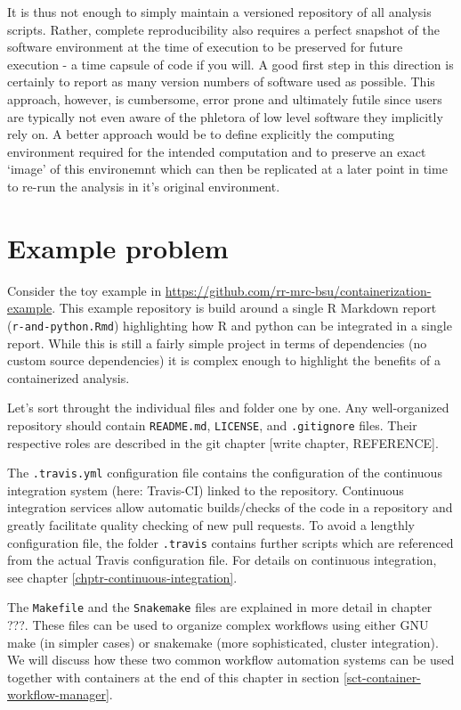 \documentclass[]{book}
\begin{document}
It is thus not enough to simply maintain a versioned repository of all
analysis scripts. Rather, complete reproducibility also requires a
perfect snapshot of the software environment at the time of execution to
be preserved for future execution - a time capsule of code if you will.
A good first step in this direction is certainly to report as many
version numbers of software used as possible. This approach, however, is
cumbersome, error prone and ultimately futile since users are typically
not even aware of the phletora of low level software they implicitly
rely on. A better approach would be to define explicitly the computing
environment required for the intended computation and to preserve an
exact `image' of this environemnt which can then be replicated at a
later point in time to re-run the analysis in it's original environment.

\section{Example problem}\label{example-problem}

Consider the toy example in
\url{https://github.com/rr-mrc-bsu/containerization-example}. This
example repository is build around a single R Markdown report
(\texttt{r-and-python.Rmd}) highlighting how R and python can be
integrated in a single report. While this is still a fairly simple
project in terms of dependencies (no custom source dependencies) it is
complex enough to highlight the benefits of a containerized analysis.

Let's sort throught the individual files and folder one by one. Any
well-organized repository should contain \texttt{README.md},
\texttt{LICENSE}, and \texttt{.gitignore} files. Their respective roles
are described in the git chapter {[}write chapter, REFERENCE{]}.

The \texttt{.travis.yml} configuration file contains the configuration
of the continuous integration system (here: Travis-CI) linked to the
repository. Continuous integration services allow automatic
builds/checks of the code in a repository and greatly facilitate quality
checking of new pull requests. To avoid a lengthly configuration file,
the folder \texttt{.travis} contains further scripts which are
referenced from the actual Travis configuration file. For details on
continuous integration, see chapter \ref{chptr-continuous-integration}.

The \texttt{Makefile} and the \texttt{Snakemake} files are explained in
more detail in chapter ???. These files can be used to organize complex
workflows using either GNU make (in simpler cases) or snakemake (more
sophisticated, cluster integration). We will discuss how these two
common workflow automation systems can be used together with containers
at the end of this chapter in section
\ref{sct-container-workflow-manager}.
\end{document}
